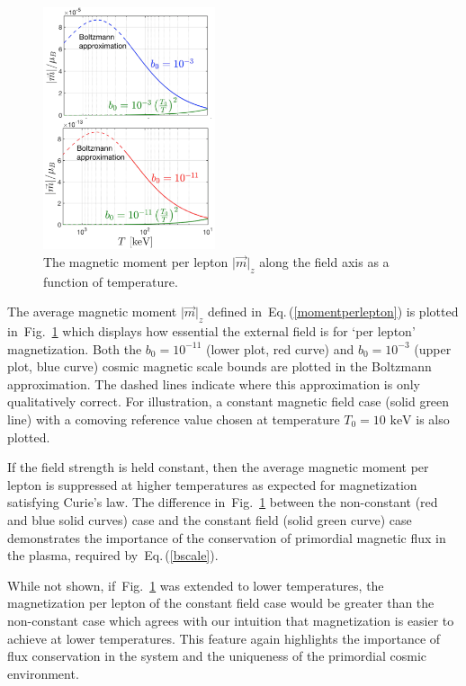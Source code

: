 \documentclass[aps,prd,floatfix,reprint]{revtex4-2}
\newcommand*{\keV}{\text{ keV}}
\newcommand{\req}[1]{Eq.\,(\ref{#1})}
\newcommand{\rf}[1]{Fig.~{\ref{#1}}}
\begin{document}
\begin{figure}[ht]
 \centering
 \includegraphics[width=0.45\textwidth]{plots/NewMagnetizationDensity004_Boltz.png}
 \caption{The magnetic moment per lepton $\vert\vec{m}\vert_{z}$ along the field axis as a function of temperature.}
 \label{fig:momentperlepton}
\end{figure}

The average magnetic moment $\vert\vec{m}\vert_{z}$ defined in~\req{momentperlepton} is plotted in~\rf{fig:momentperlepton} which displays how essential the external field is for `per lepton' magnetization. Both the $b_{0}=10^{-11}$ (lower plot, red curve) and $b_{0}=10^{-3}$ (upper plot, blue curve) cosmic magnetic scale bounds are plotted in the Boltzmann approximation. The dashed lines indicate where this approximation is only qualitatively correct. For illustration, a constant magnetic field case (solid green line) with a comoving reference value chosen at temperature $T_{0}=10\keV$ is also plotted.

If the field strength is held constant, then the average magnetic moment per lepton is suppressed at higher temperatures as expected for magnetization satisfying Curie's law. The difference in~\rf{fig:momentperlepton} between the non-constant (red and blue solid curves) case and the constant field (solid green curve) case demonstrates the importance of the conservation of primordial magnetic flux in the plasma, required by~\req{bscale}.

While not shown, if~\rf{fig:momentperlepton} was extended to lower temperatures, the magnetization per lepton of the constant field case would be greater than the non-constant case which agrees with our intuition that magnetization is easier to achieve at lower temperatures. This feature again highlights the importance of flux conservation in the system and the uniqueness of the primordial cosmic environment.
\end{document}
